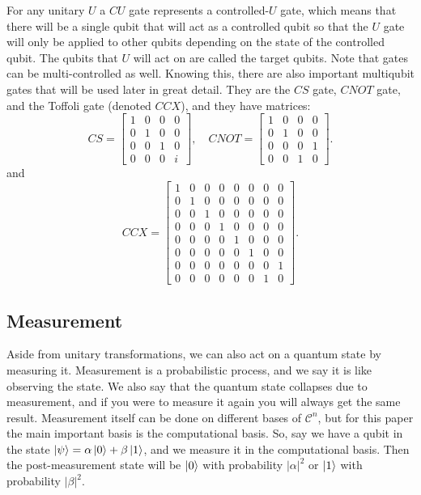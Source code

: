 \documentclass[12pt]{dalthesis}
\begin{document}
For any unitary $U$ a $CU$ gate represents a controlled-$U$ gate, which means that there will be a single qubit that will act as a controlled qubit so that the $U$ gate will only be applied to other qubits depending on the state of the controlled qubit. The qubits that $U$ will act on are called the target qubits. Note that gates can be multi-controlled as well. Knowing this, there are also important multiqubit gates that will be used later in great detail. They are the $CS$ gate, $CNOT$ gate, and the Toffoli gate (denoted $CCX$), and they have matrices:
\begin{equation*}
  CS = \begin{bmatrix}
  1 & 0 & 0 & 0 \\
  0 & 1 & 0 & 0 \\
  0 & 0 & 1 & 0 \\
  0 & 0 & 0 & i
  \end{bmatrix}, \quad
  CNOT = \begin{bmatrix}
  1 & 0 & 0 & 0 \\
  0 & 1 & 0 & 0 \\
  0 & 0 & 0 & 1 \\
  0 & 0 & 1 & 0 
  \end{bmatrix}.
\end{equation*}
and 
\begin{equation*}
  CCX = \begin{bmatrix}
  1 & 0 & 0 & 0 & 0 & 0 & 0 & 0 \\
  0 & 1 & 0 & 0 & 0 & 0 & 0 & 0 \\
  0 & 0 & 1 & 0 & 0 & 0 & 0 & 0 \\
  0 & 0 & 0 & 1 & 0 & 0 & 0 & 0 \\
  0 & 0 & 0 & 0 & 1 & 0 & 0 & 0 \\
  0 & 0 & 0 & 0 & 0 & 1 & 0 & 0 \\
  0 & 0 & 0 & 0 & 0 & 0 & 0 & 1 \\
  0 & 0 & 0 & 0 & 0 & 0 & 1 & 0 
  \end{bmatrix}.
\end{equation*}

\subsection{Measurement}
Aside from unitary transformations, we can also act on a quantum state by measuring it. Measurement is a probabilistic process, and we say it is like observing the state. We also say that the quantum state collapses due to measurement, and if you were to measure it again you will always get the same result. Measurement itself can be done on different bases of $\mathcal{C}^n$, but for this paper the main important basis is the computational basis. So, say we have a qubit in the state $\ket{\psi} = \alpha \ket{0} + \beta \ket{1}$, and we measure it in the computational basis. Then the post-measurement state will be $\ket{0}$ with probability $|\alpha |^2$ or $\ket{1}$ with probability $|\beta |^2$. 
\end{document}
